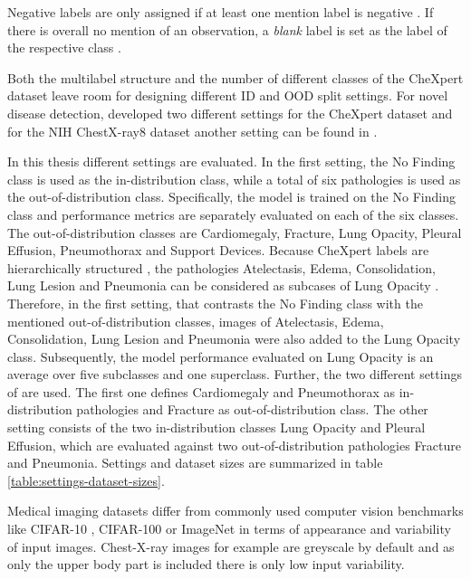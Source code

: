 Negative labels are only assigned if at least one mention label is negative \citep{Irvin2019}. 
If there is overall no mention of an observation, a \textit{blank} label is set as the label of the respective class \citep{Irvin2019}.
\par
Both the multilabel structure and the number of different classes of the CheXpert dataset leave room for designing different ID and OOD split settings.
For novel disease detection, \citep{Berger2021} developed two different settings for the CheXpert dataset and for the NIH ChestX-ray8 dataset \citep{Wang2017} another setting can be found in \citep{Cao2020}.
\par
In this thesis different settings are evaluated.
In the first setting, the No Finding class is used as the in-distribution class, while a total of six pathologies is used as the out-of-distribution class.
Specifically, the model is trained on the No Finding class and performance metrics are separately evaluated on each of the six classes.
The out-of-distribution classes are Cardiomegaly, Fracture, Lung Opacity, Pleural Effusion, Pneumothorax and Support Devices.
Because CheXpert labels are hierarchically structured \cite{Irvin2019}, the pathologies Atelectasis, Edema, Consolidation, Lung Lesion and Pneumonia can be considered as subcases of Lung Opacity \textcolor{red}{\citep{Hansell2008}}.
Therefore, in the first setting, that contrasts the No Finding class with the mentioned out-of-distribution classes, images of Atelectasis, Edema, Consolidation, Lung Lesion and Pneumonia were also added to the Lung Opacity class.
Subsequently, the model performance evaluated on Lung Opacity is an average over five subclasses and one superclass.
Further, the two different settings of \citep{Berger2021} are used.
The first one defines Cardiomegaly and Pneumothorax as in-distribution pathologies and Fracture as out-of-distribution class.
The other setting consists of the two in-distribution classes Lung Opacity and Pleural Effusion, which are evaluated against two out-of-distribution pathologies Fracture and Pneumonia.
Settings and dataset sizes are summarized in table \ref{table:settings-dataset-sizes}.
\par
Medical imaging datasets differ from commonly used computer vision benchmarks like CIFAR-10 \citep{Krizhevsky2009a}, CIFAR-100 \citep{Krizhevsky2009b} or ImageNet \citep{Deng2009} in terms of appearance and variability of input images.
Chest-X-ray images for example are greyscale by default and as only the upper body part is included there is only low input variability.
